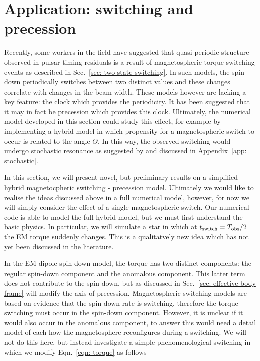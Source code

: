 \documentclass[../full_thesis/full_thesis.tex]{subfiles}
\begin{document}
\section{Application: switching and precession}

Recently, some workers in the field \citep{Lyne2010, Perera2015} have suggested
that quasi-periodic structure observed in pulsar timing residuals is a result
of magnetospheric torque-switching events as described in Sec.~\ref{sec: two
state switching}. In such models, the spin-down periodically switches between
two distinct values and these changes correlate with changes in the beam-width.
These models however are lacking a key feature: the clock which provides the
periodicity. It has been suggested \citep{Jones2012} that it may in fact be
precession which provides this clock. Ultimately, the numerical model developed
in this section could study this effect, for example by implementing a hybrid
model in which propensity for a magnetospheric switch to occur is related to
the angle $\Theta$. In this way, the observed switching would undergo
stochastic resonance as suggested by \citet{Cordes2013} and discussed in Appendix~\ref{app:
stochastic}.

In this section, we will present novel, but preliminary results on a simplified
hybrid magnetocpheric switching - precession model. Ultimately we would like to
realise the ideas discussed above in a full numerical model, however, for now
we will simply consider the effect of a single magnetospheric switch. Our numerical
code is able to model the full hybrid model, but we must first understand the
basic physics. In particular, we will simulate a star in which at
$t_{\mathrm{switch}} = T_{\textrm{obs}}/2$ the EM torque suddenly changes. This is a qualitatvely
new idea which has not yet been discussed in the literature.

In the EM dipole spin-down model, the torque has two distinct components: the
regular spin-down component and the anomalous component. This latter term
does not contribute to the spin-down, but as discussed in Sec.~\ref{sec: effective
body frame} will modify the axis of precession. Magnetospheric switching models
are based on evidence that the spin-down rate is switching, therefore the torque
switching must occur in the spin-down component. However, it is unclear if it would
also occur in the anomalous component, to answer this would need a detail model
of each how the magnetosphere reconfigures during a switching. We will not do
this here, but instead investigate a simple phenomenological switching in which we
modify Eqn.~\eqref{eqn: torque} as follows
\newcommand{\Ss}{S_{\mathrm{S}}}
\newcommand{\Sa}{S_{\mathrm{A}}}
\end{document}
